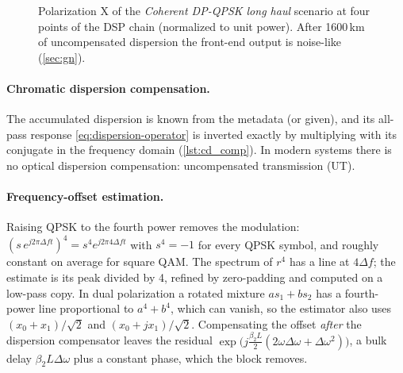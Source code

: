\begin{figure}[htbp]
\centering
{}
\caption{Polarization X of the \emph{Coherent DP-QPSK long haul} scenario at four points of the DSP
chain (normalized to unit power). After 1600\,km of uncompensated dispersion the front-end output is
noise-like (\cref{sec:gn}).}
\label{fig:coherent-const}
\end{figure}

\paragraph{Chromatic dispersion compensation.} The accumulated dispersion is known from the
metadata (or given), and its all-pass response \cref{eq:dispersion-operator} is inverted exactly by
multiplying with its conjugate in the frequency domain (\cref{lst:cd_comp}). In modern systems
there is no optical dispersion compensation: uncompensated transmission (UT).

\paragraph{Frequency-offset estimation.} Raising QPSK to the fourth power removes the modulation:
$(s\,e^{j2\pi\Delta ft})^4=s^4e^{j2\pi4\Delta ft}$ with $s^4=-1$ for every QPSK symbol, and roughly constant on
average for square QAM. The spectrum of $r^4$ has a line at $4\Delta f$; the estimate is its peak divided
by 4, refined by zero-padding and computed on a low-pass copy. In dual polarization a rotated
mixture $as_1+bs_2$ has a fourth-power line proportional to $a^4+b^4$, which can vanish, so the
estimator also uses $(x_0+x_1)/\sqrt2$ and $(x_0+jx_1)/\sqrt2$. Compensating the offset \emph{after} the
dispersion compensator leaves the residual $\exp\big(j\frac{\beta_2L}{2}(2\omega\Delta\omega+\Delta\omega^2)\big)$, a bulk delay
$\beta_2L\Delta\omega$ plus a constant phase, which the block removes.

